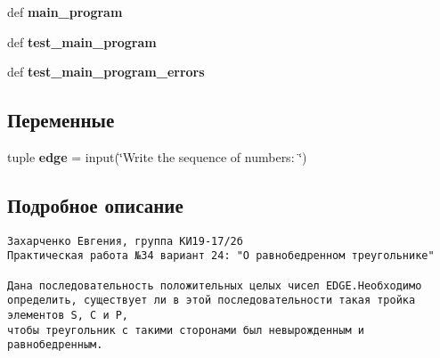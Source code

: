 \begin{CompactItemize}
\item 
\hypertarget{namespace_l_w4_0d93658326fa737552c6f158a6cb5b25}{
def \textbf{main\_\-program}}
\label{namespace_l_w4_0d93658326fa737552c6f158a6cb5b25}

\item 
\hypertarget{namespace_l_w4_fb0c2f2dd989cb209c18378abec57a21}{
def \textbf{test\_\-main\_\-program}}
\label{namespace_l_w4_fb0c2f2dd989cb209c18378abec57a21}

\item 
\hypertarget{namespace_l_w4_abd9346955da1ccd06f74a05e7bae3f4}{
def \textbf{test\_\-main\_\-program\_\-errors}}
\label{namespace_l_w4_abd9346955da1ccd06f74a05e7bae3f4}

\end{CompactItemize}
\subsection*{Переменные}
\begin{CompactItemize}
\item 
\hypertarget{namespace_l_w4_1315c420b42720eefecb16299e8d3fbb}{
tuple \textbf{edge} = input(\char`\"{}Write the sequence of numbers: \char`\"{})}
\label{namespace_l_w4_1315c420b42720eefecb16299e8d3fbb}

\end{CompactItemize}


\subsection{Подробное описание}


\footnotesize\begin{verbatim}
Захарченко Евгения, группа КИ19-17/2б
Практическая работа №34 вариант 24: "О равнобедренном треугольнике"

Дана последовательность положительных целых чисел EDGE.Необходимо
определить, существует ли в этой последовательности такая тройка элементов S, C и P,
чтобы треугольник с такими сторонами был невырожденным и равнобедренным.
\end{verbatim}
\normalsize
 

